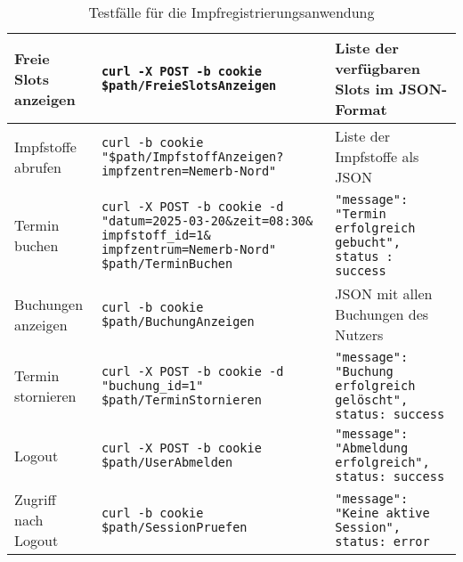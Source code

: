 \begin{table}[H]
\begin{tabular}{|p{3cm}|p{7.9cm}|p{6.7cm}|}
        Freie Slots anzeigen &
        \parbox{6cm}{
          \texttt{curl -X POST -b cookie \$path/FreieSlotsAnzeigen}
        } &
        Liste der verfügbaren Slots im JSON-Format \\ \hline

        Impfstoffe abrufen &
        \parbox{6cm}{
          \texttt{curl -b cookie} \\
          \texttt{"\$path/ImpfstoffAnzeigen?} \\
          \texttt{impfzentren=Nemerb-Nord"} \\
        } &
        Liste der Impfstoffe als JSON \\ \hline

        Termin buchen &
        \parbox{6cm}{
          \texttt{curl -X POST -b cookie -d} \\
          \texttt{"datum=2025-03-20\&zeit=08:30\&} \\
          \texttt{impfstoff\_id=1\&} \\
          \texttt{impfzentrum=Nemerb-Nord"} \\
          \texttt{\$path/TerminBuchen}
        } &
        \texttt{"message": "Termin erfolgreich gebucht", status : success} \\ \hline

        Buchungen anzeigen &
        \parbox{6cm}{
          \texttt{curl -b cookie \$path/BuchungAnzeigen}
        } &
        JSON mit allen Buchungen des Nutzers \\ \hline

        Termin stornieren &
        \parbox{6cm}{
          \texttt{curl -X POST -b cookie -d} \\
          \texttt{"buchung\_id=1"} \\
          \texttt{\$path/TerminStornieren}
        } &
        \texttt{"message": "Buchung erfolgreich gelöscht", status: success} \\ \hline

        Logout &
        \parbox{6cm}{
          \texttt{curl -X POST -b cookie \$path/UserAbmelden}
        } &
        \texttt{"message": "Abmeldung erfolgreich", status: success} \\ \hline

        Zugriff nach Logout &
        \parbox{6cm}{
          \texttt{curl -b cookie \$path/SessionPruefen}
        } &
        \texttt{"message": "Keine aktive Session", status: error} \\ \hline

    \end{tabular}
    \caption{Testfälle für die Impfregistrierungsanwendung}
    \label{tab:testfaelle}
\end{table}

\FloatBarrier %

